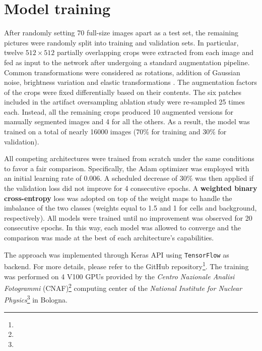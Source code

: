 \section{Model training}
\label{sec:model_training}

After randomly setting 70 full-size images apart as a test set, the remaining pictures were randomly split into training and validation sets. 
In particular, twelve $512\times512$ partially overlapping crops were extracted from each image and fed as input to the network after undergoing a standard augmentation pipeline. Common transformations were considered as rotations, addition of Gaussian noise, brightness variation and elastic transformations \cite{elastic_tranformation}. 
The augmentation factors of the crops were fixed differentially based on their contents. 
The six patches included in the artifact oversampling ablation study were re-sampled 25 times each.
Instead, all the remaining crops produced 10 augmented versions for manually segmented images and 4 for all the others.
As a result, the model was trained on a total of nearly 16000 images (70\% for training and 30\% for validation).

All competing architectures were trained from scratch under the same conditions to favor a fair comparison.
Specifically, the Adam \cite{adam} optimizer was employed with an initial learning rate of 0.006. A scheduled decrease of 30\% was then applied if the validation loss did not improve for 4 consecutive epochs. 
A \textbf{weighted binary cross-entropy} loss was adopted on top of the weight maps to handle the imbalance of the two classes (weights equal to 1.5 and 1 for cells and background, respectively).
All models were trained until no improvement was observed for 20 consecutive epochs. In this way, each model was allowed to converge and the comparison was made at the best of each architecture's capabilities.

The approach was implemented through Keras API \cite{keras} using \texttt{TensorFlow} \cite{tensorflow} as backend. For more details, please refer to the GitHub repository\footnote{\github}.
The training was performed on 4 V100 GPUs provided by the \textit{Centro Nazionale Analisi Fotogrammi} (CNAF)\footnote{\cnaf} computing center of the \textit{National Institute for Nuclear Physics}\footnote{\infn} in Bologna.
